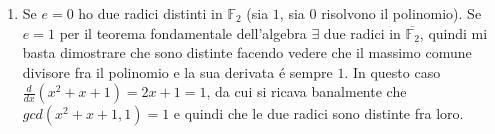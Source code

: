 \documentclass[a4paper]{article}
\newcommand{\ds}{\displaystyle}
\begin{document}
\begin{enumerate}
\begin{enumerate}
\item Se $e=0$ ho due radici distinti in $\mathbb{F}_2$ (sia $1$, sia $0$ risolvono il polinomio). 
Se $e=1$ per il teorema fondamentale dell'algebra $\exists$ due radici in $\overline{\mathbb{F}_2}$, quindi mi basta dimostrare che sono distinte facendo vedere che il massimo comune divisore fra il polinomio e la sua derivata \'e sempre $1$. In questo caso $\ds{\frac{d}{dx}(x^2+x+1)=2x+1=1}$, da cui si ricava banalmente che  
$gcd(x^2+x+1,1)=1$ e quindi che le due radici sono distinte fra loro.

 
\end{enumerate}



\end{enumerate}
\end{document}
